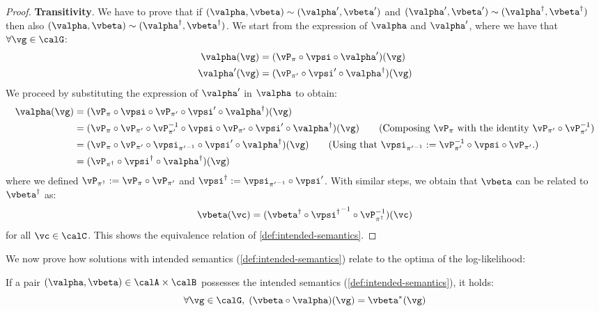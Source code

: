 \begin{proof}
    \textbf{Transitivity}. We have to prove that if $(\valpha, \vbeta) \sim (\valpha', \vbeta')$ and $(\valpha', \vbeta') \sim (\valpha^\dagger, \vbeta^\dagger) $ then also $(\valpha, \vbeta) \sim (\valpha^\dagger, \vbeta^\dagger)$. We start from the expression of $\valpha$ and $\valpha'$, where we have that $\forall \vg \in \calG$:
    \begin{align}
        \valpha(\vg) &= (\vP_\pi \circ \vpsi \circ \valpha' )(\vg) \\
        \valpha'(\vg) &= (\vP_{\pi'} \circ \vpsi' \circ \valpha^\dagger)(\vg)
    \end{align}
    We proceed by substituting the expression of $\valpha'$ in $\valpha$ to obtain:
    \begin{align}
        \valpha(\vg) &= (\vP_\pi \circ \vpsi \circ \vP_{\pi'} \circ \vpsi' \circ \valpha^\dagger)(\vg) \\
        &= (\vP_\pi \circ \vP_{\pi'} \circ \vP_{\pi'}^{-1} \circ \vpsi \circ \vP_{\pi'} \circ \vpsi' \circ \valpha^\dagger)(\vg) 
        \tag{Composing $\vP_\pi$ with the identity $\vP_{\pi'} \circ \vP_{\pi'}^{-1}$}
        \\
        &= (\vP_\pi \circ \vP_{\pi'} \circ \vpsi_{{\pi'}^{-1}} \circ \vpsi' \circ \valpha^\dagger)(\vg) 
        \tag{Using that $\vpsi_{{\pi'}^{-1}} := \vP_{\pi'}^{-1} \circ \vpsi \circ \vP_{\pi'}$.} \\
        &= (\vP_{\pi^\dagger} \circ \vpsi^\dagger \circ \valpha^\dagger) (\vg)
    \end{align}
    where we defined $\vP_{\pi^\dagger} := \vP_\pi \circ \vP_{\pi'}$ and $\vpsi^\dagger := \vpsi_{{\pi'}^{-1}} \circ \vpsi'$. 
    With similar steps, we obtain that $\vbeta$ can be related to $\vbeta^\dagger$ as:
    \[
        \vbeta (\vc) =  (\vbeta^\dagger \circ {\vpsi^{\dagger}}^{-1} \circ \vP_{\pi^\dagger}^{-1}) (\vc)
    \]
    for all $\vc \in \calC$. This shows the equivalence relation of \cref{def:intended-semantics}.
\end{proof}
 

We now prove how solutions with intended semantics (\cref{def:intended-semantics}) relate to the optima of the log-likelihood:

\begin{lemma}
    \label{lemma:intended-semantics-optima}
    If a pair $(\valpha, \vbeta) \in \calA \times \calB$ possesses the intended semantics (\cref{def:intended-semantics}), it holds:
    \[
        \forall \vg \in \calG, \; (\vbeta \circ \valpha) (\vg) = \vbeta^* (\vg)
    \]
\end{lemma}

